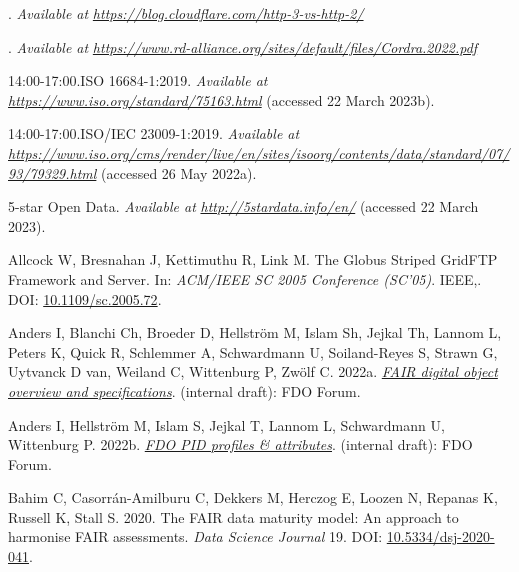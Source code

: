 \hypertarget{refs}{}
\begin{CSLReferences}{1}{0}
\leavevmode{}%
. \emph{Available at} \href{https://blog.cloudflare.com/http-3-vs-http-2/}{\emph{https://blog.cloudflare.com/http-3-vs-http-2/}}

\leavevmode{}%
. \emph{Available at} \href{https://www.rd-alliance.org/sites/default/files/Cordra.2022.pdf}{\emph{https://www.rd-alliance.org/sites/default/files/Cordra.2022.pdf}}

\leavevmode{}%
14:00-17:00.ISO 16684-1:2019. \emph{Available at} \href{https://www.iso.org/standard/75163.html}{\emph{https://www.iso.org/standard/75163.html}} (accessed 22 March 2023b).

\leavevmode{}%
14:00-17:00.ISO/IEC 23009-1:2019. \emph{Available at} \href{https://www.iso.org/cms/render/live/en/sites/isoorg/contents/data/standard/07/93/79329.html}{\emph{https://www.iso.org/cms/render/live/en/sites/isoorg/contents/data/standard/07/93/79329.html}} (accessed 26 May 2022a).

\leavevmode{}%
5-star Open Data. \emph{Available at} \href{http://5stardata.info/en/}{\emph{http://5stardata.info/en/}} (accessed 22 March 2023).

\leavevmode{}%
Allcock W, Bresnahan J, Kettimuthu R, Link M. The Globus Striped GridFTP Framework and Server. In: \emph{ACM/IEEE SC 2005 Conference (SC'05)}. IEEE,. DOI: \href{https://doi.org/10.1109/sc.2005.72}{10.1109/sc.2005.72}.

\leavevmode{}%
Anders I, Blanchi Ch, Broeder D, Hellström M, Islam Sh, Jejkal Th, Lannom L, Peters K, Quick R, Schlemmer A, Schwardmann U, Soiland-Reyes S, Strawn G, Uytvanck D van, Weiland C, Wittenburg P, Zwölf C. 2022a. \emph{\href{https://docs.google.com/document/d/1GAj-1owAAPDF7hVis2dYPPCOHiPHrIXIo4j-S5AdEFI/edit}{FAIR digital object overview and specifications}}. (internal draft): FDO Forum.

\leavevmode{}%
Anders I, Hellström M, Islam S, Jejkal T, Lannom L, Schwardmann U, Wittenburg P. 2022b. \emph{\href{https://docs.google.com/document/d/1c2mZziq5pIPmLxMHLcYqlWrjYsc2ezGMXvp0E46iljo/edit}{FDO PID profiles \& attributes}}. (internal draft): FDO Forum.

\leavevmode{}%
Bahim C, Casorrán-Amilburu C, Dekkers M, Herczog E, Loozen N, Repanas K, Russell K, Stall S. 2020. The FAIR data maturity model: An approach to harmonise FAIR assessments. \emph{Data Science Journal} 19. DOI: \href{https://doi.org/10.5334/dsj-2020-041}{10.5334/dsj-2020-041}.


\end{CSLReferences}
